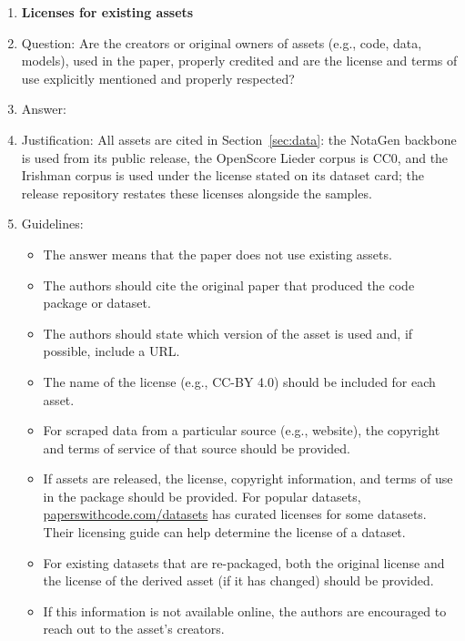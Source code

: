 \documentclass{article}
\begin{document}
\begin{enumerate}
\item {\bf Licenses for existing assets}
    \item[] Question: Are the creators or original owners of assets (e.g., code, data, models), used in the paper, properly credited and are the license and terms of use explicitly mentioned and properly respected?
    \item[] Answer: \answerYes{}
    \item[] Justification: All assets are cited in Section~\ref{sec:data}: the NotaGen backbone \citep{wang2025notagen} is used from its public release, the OpenScore Lieder corpus \citep{gotham2022lieder} is CC0, and the Irishman corpus \citep{irishman2023} is used under the license stated on its dataset card; the release repository restates these licenses alongside the samples.
    \item[] Guidelines:
    \begin{itemize}
        \item The answer \answerNA{} means that the paper does not use existing assets.
        \item The authors should cite the original paper that produced the code package or dataset.
        \item The authors should state which version of the asset is used and, if possible, include a URL.
        \item The name of the license (e.g., CC-BY 4.0) should be included for each asset.
        \item For scraped data from a particular source (e.g., website), the copyright and terms of service of that source should be provided.
        \item If assets are released, the license, copyright information, and terms of use in the package should be provided. For popular datasets, \url{paperswithcode.com/datasets} has curated licenses for some datasets. Their licensing guide can help determine the license of a dataset.
        \item For existing datasets that are re-packaged, both the original license and the license of the derived asset (if it has changed) should be provided.
        \item If this information is not available online, the authors are encouraged to reach out to the asset's creators.
    \end{itemize}


\end{enumerate}
\end{document}
